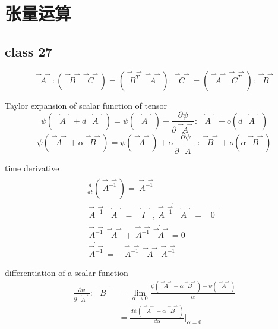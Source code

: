 \documentclass[12pt, a4paper, oneside, UTF8]{ctexbook}  %
\newcommand{\pa}{\partial}
\newcommand{\vvec}{\overset{\rightharpoonup\!\!\!\! \rightharpoonup}}
\begin{document}
\else
\fi
\chapter{张量运算}
\section{class 27}
\begin{proposition}
    \[
    \vvec{A}:\left(\vvec{B}\vvec{C}\right)
    =\left(\vvec{B^T}\vvec{A}\right):\vvec{C}
    =\left(\vvec{A}\vvec{C^T}\right):\vvec{B}\]
\end{proposition}
\begin{proposition}
    Taylor expansion of scalar function of tensor
    \[
    \psi\left(\vvec{A}+d\vvec{A}\right)=\psi\left(\vvec{A}\right)
    +\frac{\pa \psi}{\pa \vvec{A}}:\vvec{A}+o\left(d\vvec{A}\right)\]
    \[
        \psi\left(\vvec{A}+\alpha\vvec{B}\right)=\psi\left(\vvec{A}\right)
        +\alpha\frac{\pa \psi}{\pa \vvec{A}}:\vvec{B}+o\left(\alpha\vvec{B}\right)
    \]
\end{proposition}
\begin{defn}
    time derivative
\begin{gather*}
        \frac{d}{dt}\left(\vvec{A^{-1}}\right)=\dot{\vvec{A^{-1}}}\\
        \vvec{A^{-1}}\vvec{A}=\vvec{I},\dot{\vvec{A^{-1}}\vvec{A}}=\vvec0\\
        \dot{\vvec{A^{-1}}}\vvec{A}+\vvec{A^{-1}}\dot{\vvec{A}}=0\\
        \dot{\vvec{A^{-1}}}=-\vvec{A^{-1}}\dot{\vvec{A}}\vvec{A^{-1}}
\end{gather*}
\end{defn}
\begin{defn}
    differentiation of a scalar function
    \begin{align*}
        \frac{\pa \psi}{\pa \vvec{A}}:\vvec{B}&=\lim_{\alpha\rightarrow0}
        \frac{\psi\left(\vvec{A}+\alpha\vvec{B}\right)-\psi\left(\vvec{A}\right)}{\alpha}\\
        &=\frac{d\psi\left(\vvec{A}+\alpha\vvec{B}\right)}{d\alpha}|_{\alpha=0}
    \end{align*}
\end{defn}
\end{document}
